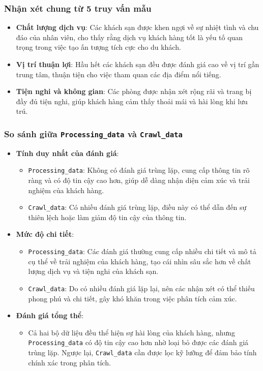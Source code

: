 \subsubsection{Nhận xét chung từ 5 truy vấn mẫu}

\begin{itemize}
    \item \textbf{Chất lượng dịch vụ}: Các khách sạn được khen ngợi về sự nhiệt tình và chu đáo của nhân viên, cho thấy rằng dịch vụ khách hàng tốt là yếu tố quan trọng trong việc tạo ấn tượng tích cực cho du khách.
    \item \textbf{Vị trí thuận lợi}: Hầu hết các khách sạn đều được đánh giá cao về vị trí gần trung tâm, thuận tiện cho việc tham quan các địa điểm nổi tiếng.
    \item \textbf{Tiện nghi và không gian}: Các phòng được nhận xét rộng rãi và trang bị đầy đủ tiện nghi, giúp khách hàng cảm thấy thoải mái và hài lòng khi lưu trú.
\end{itemize}

\subsubsection{So sánh giữa \texttt{Processing\_data} và \texttt{Crawl\_data}}

\begin{itemize}
    \item \textbf{Tính duy nhất của đánh giá}:
    \begin{itemize}
        \item \texttt{Processing\_data}: Không có đánh giá trùng lặp, cung cấp thông tin rõ ràng và có độ tin cậy cao hơn, giúp dễ dàng nhận diện cảm xúc và trải nghiệm của khách hàng.
        \item \texttt{Crawl\_data}: Có nhiều đánh giá trùng lặp, điều này có thể dẫn đến sự thiên lệch hoặc làm giảm độ tin cậy của thông tin.
    \end{itemize}

    \item \textbf{Mức độ chi tiết}:
    \begin{itemize}
        \item \texttt{Processing\_data}: Các đánh giá thường cung cấp nhiều chi tiết và mô tả cụ thể về trải nghiệm của khách hàng, tạo cái nhìn sâu sắc hơn về chất lượng dịch vụ và tiện nghi của khách sạn.
        \item \texttt{Crawl\_data}: Do có nhiều đánh giá lặp lại, nên các nhận xét có thể thiếu phong phú và chi tiết, gây khó khăn trong việc phân tích cảm xúc.
    \end{itemize}

    \item \textbf{Đánh giá tổng thể}:
    \begin{itemize}
        \item Cả hai bộ dữ liệu đều thể hiện sự hài lòng của khách hàng, nhưng \texttt{Processing\_data} có độ tin cậy cao hơn nhờ loại bỏ được các đánh giá trùng lặp. Ngược lại, \texttt{Crawl\_data} cần được lọc kỹ lưỡng để đảm bảo tính chính xác trong phân tích.
    \end{itemize}
\end{itemize}

